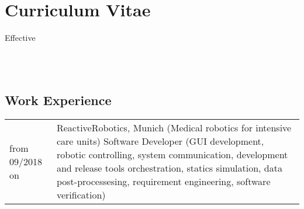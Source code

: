 \documentclass[a4paper,10pt]{memoir}
\begin{document}
\section*{\color{MidnightBlue} Curriculum Vitae}

\begin{flushright}
  Effective \monthname \, \the\year
\end{flushright}


\\
\\

\vspace*{5mm}
\subsection*{Work Experience}
\vspace*{-\baselineskip}
\begin{longtable}{@{}p{} p{}}
  from 09/2018 on &
  ReactiveRobotics, Munich (Medical robotics for intensive care units) \newline
  Software Developer (GUI development, robotic controlling, system communication, development and release tools orchestration, statics simulation, data post-processesing, requirement engineering, software verification)
\end{longtable}
\end{document}
